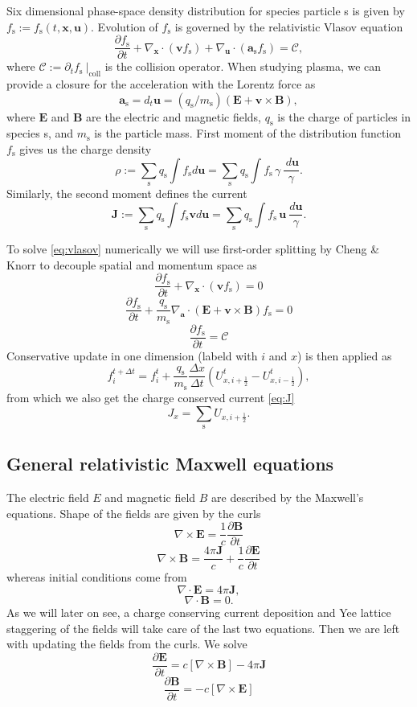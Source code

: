 \documentclass{aa}
\newcommand{\be}{\begin{equation}}
\newcommand{\ee}{\end{equation}}
\newcommand{\D}[2]{\ensuremath{\frac{\partial {#1} }{\partial {#2} }}}
\newcommand{\f}[1]{\ensuremath{f_{\mathrm{ {#1} }}}}
\renewcommand{\vec}[1]{\ensuremath{\boldsymbol{#1}}}
\begin{document}
Six dimensional phase-space density distribution for species particle s is given by $\f{s} := \f{s}(t, \vec{x}, \vec{u})$.
Evolution of $\f{s}$ is governed by the relativistic Vlasov equation
\be\label{eq:vlasov}
\D{\f{s}}{t} + \nabla_{\vec{x}} \cdot (\vec{v} \f{s}) + \nabla_{\vec{u}} \cdot (\vec{a}_{\mathrm{s}} \f{s} ) = \mathcal{C},
\ee
where $\mathcal{C} := \partial_t \f{s} ~|_{\mathrm{coll}}$ is the collision operator.
When studying plasma, we can provide a closure for the acceleration with the Lorentz force as 
\be
\vec{a}_{\mathrm{s}} = d_t \vec{u} = (q_{\mathrm{s}} / m_{\mathrm{s}} )(\vec{E} + \vec{v} \times \vec{B}),
\ee
where $\vec{E}$ and $\vec{B}$ are the electric and magnetic fields, $q_{\mathrm{s}}$ is the charge of particles in species s, and $m_{\mathrm{s}}$ is the particle mass.
First moment of the distribution function $\f{s}$ gives us the charge density
\be
\rho := \sum_{\mathrm{s}} q_{\mathrm{s}} \int \f{s} d\vec{u} = \sum_{\mathrm{s}} q_{\mathrm{s}} \int \f{s} \, \gamma \, \frac{ ~d\vec{u}}{\gamma}.
\ee
Similarly, the second moment defines the current
\be\label{eq:J}
\vec{J} := \sum_{\mathrm{s}} q_{\mathrm{s}} \int \f{s} \vec{v} d\vec{u} = \sum_{\mathrm{s}} q_{\mathrm{s}} \int \f{s} \, \vec{u} ~\frac{ d\vec{u}}{\gamma}.
\ee

To solve \eqref{eq:vlasov} numerically we will use first-order splitting by Cheng \& Knorr to decouple spatial and momentum space as
\be
\D{\f{s}}{t} + \nabla_{\vec{x}} \cdot (\vec{v} \f{s} ) = 0
\ee
\be
\D{\f{s}}{t} +\frac{q_{\mathrm{s}}}{m_{\mathrm{s}}} \nabla_{\vec{a}} \cdot ( \vec{E} + \vec{v} \times \vec{B} ) \f{s} = 0
\ee
\be
\D{\f{s}}{t} = \mathcal{C}
\ee
Conservative update in one dimension (labeld with $i$ and $x$) is then applied as
\be
f_{i}^{t+\Delta t} = f_{i}^{t} + \frac{q_{\mathrm{s}}}{m_{\mathrm{s}}}  \frac{\Delta x}{\Delta t}( U_{x, i+\frac{1}{2}}^t - U_{x, i-\frac{1}{2}}^t ),
\ee
from which we also get the charge conserved current \eqref{eq:J}
\be
J_x = \sum_{\mathrm{s}} U_{x, i+\frac{1}{2}}.
\ee



\subsection{General relativistic Maxwell equations}
The electric field $E$ and magnetic field $B$ are described by the Maxwell's equations.
Shape of the fields are given by the curls
\be
\nabla \times \vec{E} = \frac{1}{c} \frac{\partial \vec{B}} {\partial t}
\ee
\be
\nabla \times \vec{B} = \frac{4 \pi \vec{J}}{c} + \frac{1}{c} \frac{\partial \vec{E}} {\partial t}
\ee
whereas initial conditions come from
\be
\nabla \cdot \vec{E} = 4\pi\vec{J},
\ee
\be
\nabla \cdot \vec{B} = 0.
\ee
As we will later on see, a charge conserving current deposition and Yee lattice staggering of the fields will take care of the last two equations.
Then we are left with updating the fields from the curls.
We solve
\be
\frac{\partial \vec{E}}{\partial t} = c [ \nabla \times \vec{B}] - 4\pi \vec{J}
\ee
\be
\frac{\partial \vec{B}}{\partial t} = -c[ \nabla \times \vec{E}]
\ee
\end{document}
